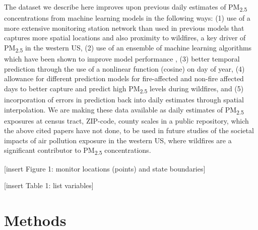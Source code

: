 \documentclass[english]{article}
\begin{document}
The dataset we describe here improves upon previous daily estimates of PM\textsubscript{2.5} concentrations from machine learning models in the following ways: (1) use of a more extensive monitoring station network than used in previous models that captures more spatial locations and also proximity to wildfires, a key driver of PM\textsubscript{2.5} in the western US, (2) use of an ensemble of machine learning algorithms which have been shown to improve model performance \cite{di_ensemble-based_2019}, (3) better temporal prediction through the use of a nonlinear function (cosine) on day of year, (4) allowance for different prediction models for fire-affected and non-fire affected days to better capture and predict high PM\textsubscript{2.5} levels during wildfires, and (5) incorporation of errors in prediction back into daily estimates through spatial interpolation. We are making these data available as daily estimates of PM\textsubscript{2.5} exposures at census tract, ZIP-code, county scales in a public repository, which the above cited papers have not done, to be used in future studies of the societal impacts of air pollution exposure in the western US, where wildfires are a significant contributor to PM\textsubscript{2.5} concentrations.

[insert Figure 1:  monitor locations (points) and state boundaries] %

[insert Table 1: list variables]

\section*{Methods}

\end{document}
